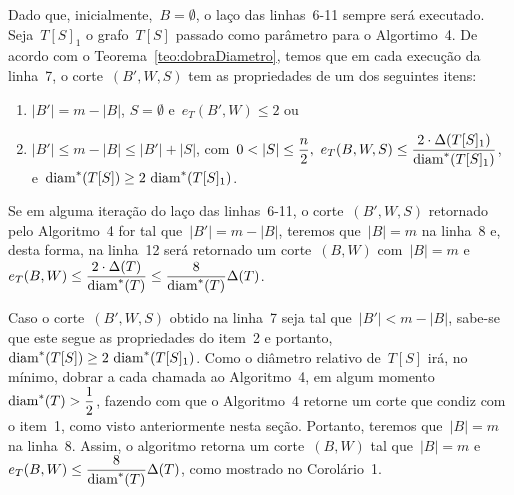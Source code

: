 		



		\bigskip

		Dado que, inicialmente,~$B=\emptyset$, o laço das
		linhas~6-11 sempre será executado.
		Seja~$T[S]_1$ o grafo~$T[S]$ passado como parâmetro para o Algortimo~4.
		De acordo com o Teorema~\ref{teo:dobraDiametro},
		temos que em cada execução da linha~7, o corte~$(B',W,S)$
		tem as propriedades de um dos seguintes itens:
		\begin{enumerate}
			\item $|B'|=m-|B|$, $S=\emptyset$ e~$e_T(B',W)\le 2$ ou
			\item ${|B'|\le m-|B|\le |B'|+|S|}$, 
				com~${0<|S|\le\dfrac{n}{2},\
				e_T(B,W,S)\le \dfrac{2\cdot 
				\Delta(T[S]_1)}{\diam^*(T[S]_1)}}$, 
				e~${\diam^*(T[S])\ge 2\ \diam^*(T[S]_1)}$.
		\end{enumerate} 
		Se em alguma iteração do laço das linhas~6-11, o corte~$(B',W,S)$ 
		retornado pelo Algoritmo~4 for tal que~${|B'| = m-|B|}$, 
		teremos que~${|B|=m}$ na linha~8 e,
		desta forma, na linha~12 será retornado um corte~$(B,W)$ 
		com~${|B| = m}$ e~${e_T(B,W) \le \dfrac{2\cdot 
			\Delta(T)}{\mathrm{diam}^*(T)}\le \dfrac{8}{\mathrm{diam}^*(T)}\Delta(T)}$.

		Caso o corte~$(B',W,S)$ obtido na linha~7 seja tal que~${|B'|<m-|B|}$,
		sabe-se que este segue as propriedades do item~2
		e portanto,~${\diam^*(T[S])\ge 2\ \diam^*(T[S]_1)}$.
		 Como o diâmetro relativo de~$T[S]$ irá, no mínimo,
		dobrar a cada chamada ao Algoritmo~4,
		em algum momento~${\mathrm{diam}^*(T)>\dfrac{1}{2}}$, fazendo
		com que o Algoritmo~4 retorne um corte
		que condiz com o item~1,
		como visto anteriormente nesta seção.
		Portanto, teremos que~${|B|=m}$ na linha~8.
		Assim, o algoritmo retorna um corte~$(B,W)$ tal que~${|B| = m}$ 
		e~${e_T(B,W) \le \dfrac{8}{\mathrm{diam}^*(T)}\Delta(T)}$, como mostrado
		no Corolário~1.
		
